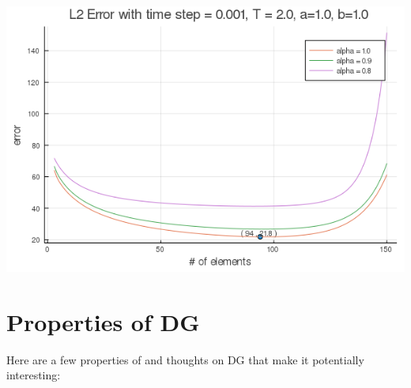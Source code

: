 \documentclass{article}
\begin{document}
\includegraphics[scale=.5]{upwind_with_best_lambda_1.png}

\newpage


\section{Properties of DG}


Here are a few properties of and thoughts on  DG that make it potentially interesting:
\end{document}
